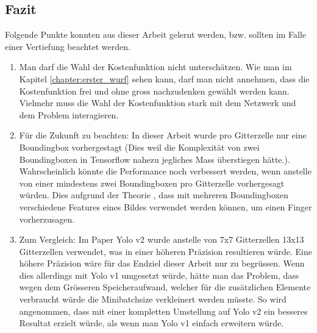 \subsection{Fazit}
Folgende Punkte konnten aus dieser Arbeit gelernt werden, bzw. sollten im Falle einer Vertiefung beachtet werden. 
\begin{enumerate}
\item Man darf die Wahl der Kostenfunktion nicht unterschätzen. 
Wie man im Kapitel \ref{chapter:erster_wurf} sehen kann, darf man nicht annehmen, dass die Kostenfunktion frei und ohne gross nachzudenken gewählt werden kann. 
Vielmehr muss die Wahl der Kostenfunktion stark mit dem Netzwerk und dem Problem interagieren. 

\item Für die Zukunft zu beachten: In dieser Arbeit wurde pro Gitterzelle nur eine Boundingbox vorhergestagt (Dies weil die Komplexität von zwei Boundingboxen in Tensorflow nahezu jegliches Mass überstiegen hätte.). Wahrscheinlich könnte die Performance noch verbessert werden, wenn anstelle von einer mindestens zwei Boundingboxen pro Gitterzelle vorhergesagt würden. Dies aufgrund der Theorie \cite{PrivateCommunication}, dass mit mehreren Boundingboxen verschiedene Features eines Bildes verwendet werden können, um einen Finger vorherzusagen.

\item Zum Vergleich: Im Paper Yolo v2 wurde anstelle von 7x7 Gitterzellen 13x13 Gitterzellen verwendet, was in einer höheren Präzision resultieren würde. 
Eine höhere Präzision wäre für das Endziel dieser Arbeit nur zu begrüssen. 
Wenn dies allerdings mit Yolo v1 umgesetzt würde, hätte man das Problem, dass wegen dem Grösseren Speicheraufwand, welcher für die zusätzlichen Elemente \grqq{}verbraucht\grqq{} würde die Minibatchsize verkleinert werden müsste. 
So wird angenommen, dass mit einer kompletten Umstellung auf Yolo v2 ein besseres Resultat erzielt würde, als wenn man Yolo v1 einfach erweitern würde.  
\end{enumerate}
